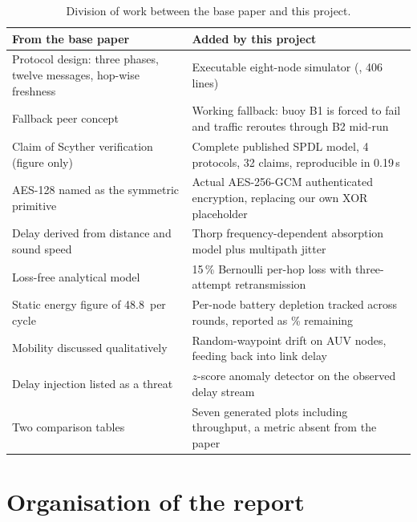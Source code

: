 \begin{table}[H]
\centering
\caption{Division of work between the base paper and this project.}
\label{tab:contribution}
\small
\begin{tabularx}{\textwidth}{@{}L{46mm} X@{}}
\toprule
\textbf{From the base paper} & \textbf{Added by this project}\\
\midrule
Protocol design: three phases, twelve messages, hop-wise freshness &
Executable eight-node simulator (, 406 lines)\\
\addlinespace[2pt]
Fallback peer concept &
Working fallback: buoy B1 is forced to fail and traffic reroutes through B2 mid-run\\
\addlinespace[2pt]
Claim of Scyther verification (figure only) &
Complete published SPDL model, 4 protocols, 32 claims, reproducible in 0.19\,s\\
\addlinespace[2pt]
AES-128 named as the symmetric primitive &
Actual AES-256-GCM authenticated encryption, replacing our own XOR placeholder\\
\addlinespace[2pt]
Delay derived from distance and sound speed &
Thorp frequency-dependent absorption model plus multipath jitter\\
\addlinespace[2pt]
Loss-free analytical model &
15\,\% Bernoulli per-hop loss with three-attempt retransmission\\
\addlinespace[2pt]
Static energy figure of 48.8\,\uJ{} per cycle &
Per-node battery depletion tracked across rounds, reported as \% remaining\\
\addlinespace[2pt]
Mobility discussed qualitatively &
Random-waypoint drift on AUV nodes, feeding back into link delay\\
\addlinespace[2pt]
Delay injection listed as a threat &
$z$-score anomaly detector on the observed delay stream\\
\addlinespace[2pt]
Two comparison tables &
Seven generated plots including throughput, a metric absent from the paper\\
\bottomrule
\end{tabularx}
\end{table}

\section{Organisation of the report}

